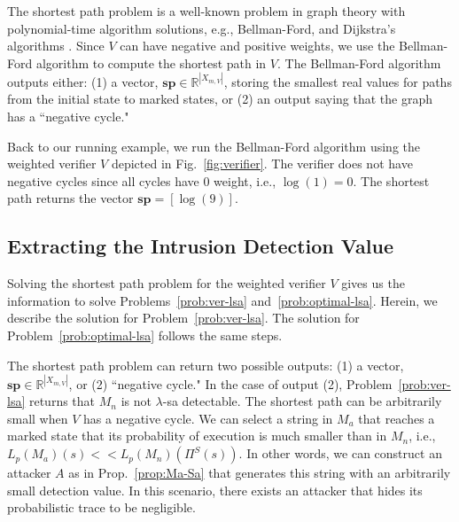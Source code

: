 The shortest path problem is a well-known problem in graph theory with polynomial-time algorithm solutions, e.g., Bellman-Ford, and Dijkstra's algorithms \citep{cormen2022introduction}.
Since $V$ can have negative and positive weights, we use the Bellman-Ford algorithm to compute the shortest path in $V$.
The Bellman-Ford algorithm outputs either: (1) a vector, $\mathbf{sp} \in \mathbb{R}^{|X_{m,V}|}$, storing the smallest real values for paths from the initial state to marked states, or (2) an output saying that the graph has a ``negative cycle."

Back to our running example, we run the Bellman-Ford algorithm using the weighted verifier $V$ depicted in Fig.~\ref{fig:verifier}.
The verifier does not have negative cycles since all cycles have $0$ weight, i.e., $\log(1) = 0$.
The shortest path returns the vector $\mathbf{sp} = [\log(9)]$.

\subsection{Extracting the Intrusion Detection Value}
Solving the shortest path problem for the weighted verifier $V$ gives us the information to solve Problems~\ref{prob:ver-lsa} and~\ref{prob:optimal-lsa}.
Herein, we describe the solution for Problem~\ref{prob:ver-lsa}.
The solution for Problem~\ref{prob:optimal-lsa} follows the same steps.

The shortest path problem can return two possible outputs: (1) a vector, $\mathbf{sp}\in \mathbb{R}^{|X_{m,V}|}$, or (2) ``negative cycle."
In the case of output (2), Problem~\ref{prob:ver-lsa} returns that $M_n$ is not $\lambda$-sa detectable.
The shortest path can be arbitrarily small when $V$ has a negative cycle.
We can select a string in $M_a$ that reaches a marked state that its probability of execution is much smaller than in $M_n$, i.e., $L_p(M_a)(s)<< L_p(M_n)(\Pi^S(s))$.
In other words, we can construct an attacker $A$ as in Prop.~\ref{prop:Ma-Sa} that generates this string with an arbitrarily small detection value. 
In this scenario, there exists an attacker that hides its probabilistic trace to be negligible.

